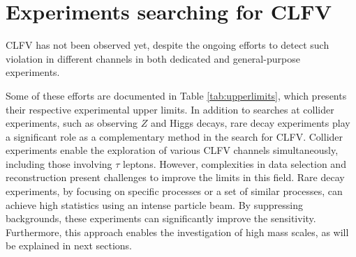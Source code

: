 \section{Experiments searching for CLFV}
CLFV has not been observed yet, despite the ongoing efforts to 
detect such violation in different channels in both dedicated and general-purpose experiments.

Some of these efforts are documented in Table \ref{tab:upperlimits}, which 
presents their respective experimental upper limits. 
In addition to searches at collider experiments, such as observing $Z$ and 
Higgs decays, rare decay experiments play a significant role as a complementary method in the search for CLFV. 
Collider experiments enable the exploration of various CLFV channels simultaneously, 
including those involving $\tau$ leptons. 
However, complexities in data selection and reconstruction 
present challenges to improve the limits in this field.
Rare decay experiments, by focusing on specific processes or a 
set of similar processes, can achieve high statistics using an intense particle beam. 
By suppressing backgrounds, these experiments can 
significantly improve the sensitivity. Furthermore, this approach 
enables the investigation of high mass scales, as will be explained in next sections.

